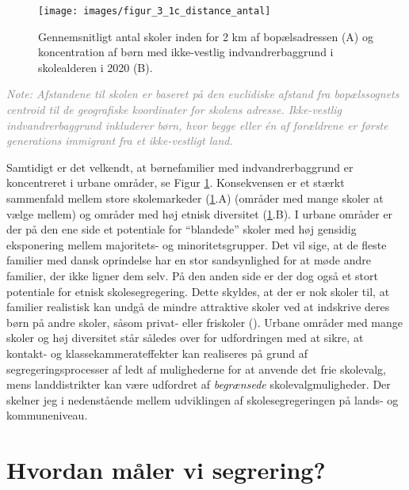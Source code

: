 \documentclass[
]{book}
\begin{document}
\begin{figure}
\texttt{[image: images/figur\_3\_1c\_distance\_antal]} \caption{Gennemsnitligt antal skoler inden for 2 km af bopælsadressen (A) og koncentration af børn med ikke-vestlig indvandrerbaggrund i skolealderen i 2020 (B).}\label{fig:fig-4-1}
\end{figure}

\begin{footnotesize}\textit{\textcolor{gray}{
Note: Afstandene til skolen er baseret på den euclidiske afstand fra bopælssognets centroid til de geografiske koordinater for skolens adresse. Ikke-vestlig indvandrerbaggrund inkluderer børn, hvor begge eller én af forældrene er første generations immigrant fra et ikke-vestligt land.
}}
\end{footnotesize}

Samtidigt er det velkendt, at børnefamilier med indvandrerbaggrund er koncentreret i urbane områder, se Figur \ref{fig:fig-4-1}. Konsekvensen er et stærkt sammenfald mellem store skolemarkeder (\ref{fig:fig-4-1}.A) (områder med mange skoler at vælge mellem) og områder med høj etnisk diversitet (\ref{fig:fig-4-1}.B). I urbane områder er der på den ene side et potentiale for ``blandede'' skoler med høj gensidig eksponering mellem majoritets- og minoritetsgrupper. Det vil sige, at de fleste familier med dansk oprindelse har en stor sandsynlighed for at møde andre familier, der ikke ligner dem selv. På den anden side er der dog også et stort potentiale for etnisk skolesegregering. Dette skyldes, at der er nok skoler til, at familier realistisk kan undgå de mindre attraktive skoler ved at indskrive deres børn på andre skoler, såsom privat- eller friskoler (). Urbane områder med mange skoler og høj diversitet står således over for udfordringen med at sikre, at kontakt- og klassekammerateffekter kan realiseres på grund af segregeringsprocesser af ledt af mulighederne for at anvende det frie skolevalg, mens landdistrikter kan være udfordret af \emph{begrænsede} skolevalgmuligheder. Der skelner jeg i nedenstående mellem udviklingen af skolesegregeringen på lands- og kommuneniveau.

\section{Hvordan måler vi segrering?}\label{hvordan-muxe5ler-vi-segrering}
\end{document}
